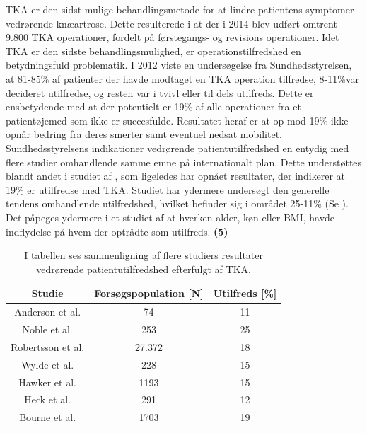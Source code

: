 TKA er den sidst mulige behandlingsmetode for at lindre patientens symptomer vedrørende knæartrose. Dette resulterede i at der i 2014 blev udført omtrent 9.800 TKA operationer, fordelt på førstegangs- og revisions operationer. \citep{aarsrapport2016} Idet TKA er den sidste behandlingsmulighed, er operationstilfredshed en betydningsfuld problematik. I 2012 viste en undersøgelse fra Sundhedsstyrelsen, at 81-85\% af patienter der havde modtaget en TKA operation tilfredse, 8-11\%var decideret utilfredse, og resten var i tvivl eller til dels utilfreds. Dette er ensbetydende med at der potentielt er 19\% af alle operationer fra et patientøjemed som ikke er succesfulde. Resultatet heraf er at op mod 19\% ikke opnår bedring fra deres smerter samt eventuel nedsat mobilitet. \citep{brostrom2012} Sundhedsstyrelsens indikationer vedrørende patientutilfredshed en entydig med flere studier omhandlende samme emne på internationalt plan. Dette understøttes blandt andet i studiet af \cite{Bourne2010}, som ligeledes har opnået resultater, der indikerer at 19\% er utilfredse med TKA. Studiet har ydermere undersøgt den generelle tendens omhandlende utilfredshed, hvilket befinder sig i området 25-11\% (Se ). \citep{Bourne2010} Det påpeges ydermere i et studiet af \cite{Jacobs2014} at hverken alder, køn eller BMI, havde indflydelse på hvem der optrådte som utilfreds. \citep{Jacobs2014}   \textbf{(5)}
\begin{table}[H]
	\centering
\begin{tabular}{ccc}
	\hline
	\rowcolor[HTML]{C0C0C0} 
	Studie            & Forsøgspopulation {[}N{]} & Utilfreds {[}\%{]} \\ \hline
	Anderson et al.   & 74                        & 11                 \\
	Noble et al.      & 253                       & 25                 \\
	Robertsson et al. & 27.372                    & 18                 \\
	Wylde et al.      & 228                       & 15                 \\
	Hawker et al.     & 1193                      & 15                 \\
	Heck et al.       & 291                       & 12                 \\
	Bourne et al.     & 1703                      & 19                 \\ \hline
\end{tabular}
	\caption{I tabellen ses \cite{Bourne2010} sammenligning af flere studiers resultater vedrørende patientutilfredshed efterfulgt af TKA. \citep{Bourne2010}}
	\label{tab:patient_utilfreds}
\end{table}
